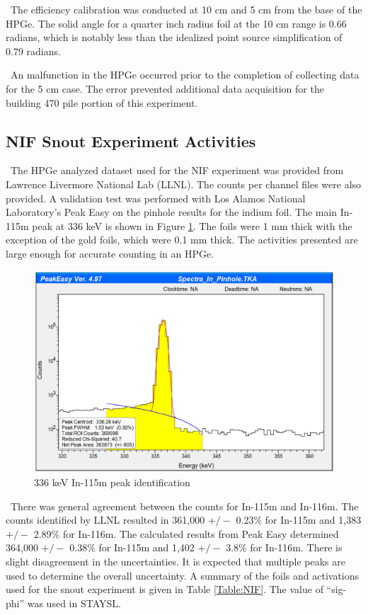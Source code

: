 \documentclass[journal]{IEEEtran}
\let\MYoriglatexcaption\caption
\renewcommand{\caption}[2][\relax]{\MYoriglatexcaption[#2]{#2}}
\begin{document}
	\ The efficiency calibration was conducted at 10 cm and 5 cm from the base of the HPGe. 
The solid angle for a quarter inch radius foil at the 10 cm range is 0.66 radians, which is notably less than the idealized point source simplification of 0.79 radians. 
	
	\ An malfunction in the HPGe occurred prior to the completion of collecting data for the 5 cm case. 
The error prevented additional data acquisition for the building 470 pile portion of this experiment.
	
	\subsection{NIF Snout Experiment Activities}
	  
	\ The HPGe analyzed dataset used for the NIF experiment was provided from Lawrence Livermore National Lab (LLNL). 
The counts per channel files were also provided. 
A validation test was performed with Los Alamos National Laboratory's Peak Easy on the pinhole results for the indium foil. 
The main In-115m peak at 336 keV is shown in Figure \ref{fig:peakez}. 
The foils were 1 mm thick with the exception of the gold foils, which were 0.1 mm thick. 
The activities presented are large enough for accurate counting in an HPGe. 
	
	\begin{figure}[h]
		\includegraphics[width=\linewidth]{Figures/PeakEZ.png}
		\caption{336 keV In-115m peak identification}
		\label{fig:peakez}
	\end{figure}

	\ There was general agreement between the counts for In-115m and In-116m. 
The counts identified by LLNL resulted in 361,000 $+/-$ 0.23\% for In-115m and 1,383 $+/-$ 2.89\% for In-116m. 
The calculated results from Peak Easy determined 364,000 $+/-$ 0.38\% for In-115m and 1,402 $+/-$ 3.8\% for In-116m. 
There is slight disagreement in the uncertainties. 
It is expected that multiple peaks are used to determine the overall uncertainty. 
A summary of the foils and activations used for the snout experiment is given in Table \ref{Table:NIF}. The value of ``sig-phi'' was used in STAYSL.
	
\end{document}
